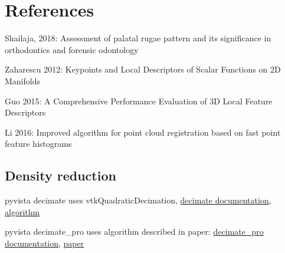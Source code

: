\documentclass[11pt]{article}
\theoremstyle{definition}
\begin{document}
\newpage

\section{References}

Shailaja, 2018: Assessment of palatal rugae pattern and its significance in orthodontics and forensic odontology

Zaharescu 2012: Keypoints and Local Descriptors of Scalar Functions on 2D Manifolds

Guo 2015: A Comprehensive Performance Evaluation of 3D Local Feature Descriptors

Li 2016: Improved algorithm for point cloud registration based on fast point feature histograms

\subsection{Density reduction}

pyvista decimate uses vtkQuadraticDecimation, \href{https://docs.pyvista.org/api/core/_autosummary/pyvista.polydatafilters.decimate}{decimate documentation}, \href{https://vtk.org/doc/nightly/html/classvtkQuadricDecimation.html}{algorithm}

pyvista decimate\_pro uses algorithm described in paper: \href{https://docs.pyvista.org/api/core/_autosummary/pyvista.polydatafilters.decimate_pro}{decimate\_pro documentation}, \href{https://dl.acm.org/doi/10.1145/133994.134010}{paper}
\end{document}
